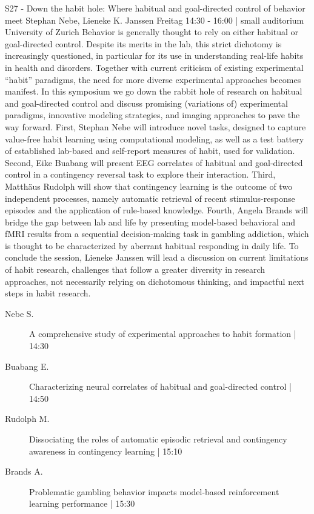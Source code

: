 
            \begin{symposium}
            {S27 - Down the habit hole: Where habitual and goal-directed control of behavior meet}
            {Stephan Nebe, Lieneke K. Janssen}
            {Freitag 14:30 - 16:00 | small auditorium}
            { University of Zurich}
            Behavior is generally thought to rely on either habitual or goal-directed control. Despite its merits in the lab, this strict dichotomy is increasingly questioned, in particular for its use in understanding real-life habits in health and disorders. Together with current criticism of existing experimental “habit” paradigms, the need for more diverse experimental approaches becomes manifest. In this symposium we go down the rabbit hole of research on habitual and goal-directed control and discuss promising (variations of) experimental paradigms, innovative modeling strategies, and imaging approaches to pave the way forward. First, Stephan Nebe will introduce novel tasks, designed to capture value-free habit learning using computational modeling, as well as a test battery of established lab-based and self-report measures of habit, used for validation. Second, Eike Buabang will present EEG correlates of habitual and goal-directed control in a contingency reversal task to explore their interaction. Third, Matthäus Rudolph will show that contingency learning is the outcome of two independent processes, namely automatic retrieval of recent stimulus-response episodes and the application of rule-based knowledge. Fourth, Angela Brands will bridge the gap between lab and life by presenting model-based behavioral and fMRI results from a sequential decision-making task in gambling addiction, which is thought to be characterized by aberrant habitual responding in daily life. To conclude the session, Lieneke Janssen will lead a discussion on current limitations of habit research, challenges that follow a greater diversity in research approaches, not necessarily relying on dichotomous thinking, and impactful next steps in habit research.
            \begin{description}    
            
                \item [ Nebe S.] A comprehensive study of experimental approaches to habit formation \textcolor{mygray}{ | 14:30}    
                
                \item [ Buabang E.] Characterizing neural correlates of habitual and goal-directed control \textcolor{mygray}{ | 14:50}    
                
                \item [ Rudolph M.] Dissociating the roles of automatic episodic retrieval and contingency awareness in contingency learning \textcolor{mygray}{ | 15:10}    
                
                \item [ Brands A.] Problematic gambling behavior impacts model-based reinforcement learning performance \textcolor{mygray}{ | 15:30}    
                
            \end{description} 
            \end{symposium}
            
